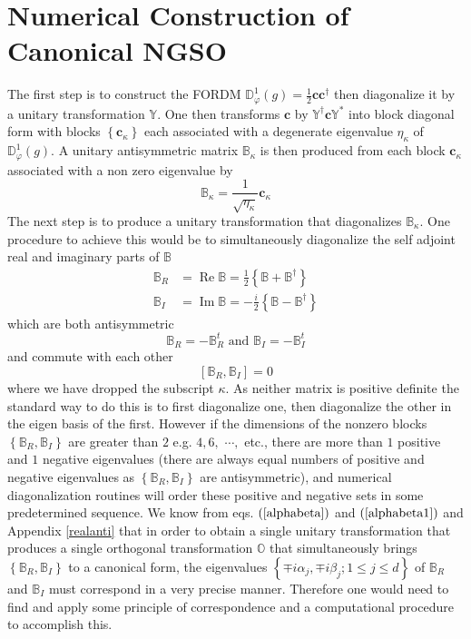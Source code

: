 \documentclass[aps,preprint]{revtex4}%
\begin{document}
\section{Numerical Construction of Canonical NGSO\label{numerical}}

The first step is to construct the FORDM $\mathbb{D}_{\varphi}^{1}\left(
g\right)  =\frac{1}{2}\mathbf{cc}^{\dagger}$ then diagonalize it by a unitary
transformation $\mathbb{Y}$. One then transforms $\mathbf{c}$ by
$\mathbb{Y}^{\dagger}\mathbf{c}\mathbb{Y}^{\ast}$ into block diagonal form
with blocks $\left\{  \mathbf{c}_{\kappa}\right\}  $ each associated with a
degenerate eigenvalue $\eta_{\kappa}$ of $\mathbb{D}_{\varphi}^{1}\left(
g\right)  .$ A unitary antisymmetric matrix $\mathbb{B}_{\kappa}$ is then
produced from each block $\mathbf{c}_{\kappa}$ associated with a non zero
eigenvalue by
\begin{equation}
\mathbb{B}_{\kappa}=\frac{1}{\sqrt{\eta_{\kappa}}}\mathbf{c}_{\kappa}%
\end{equation}
The next step is to produce a unitary transformation that diagonalizes
$\mathbb{B}_{\kappa}$. One procedure to achieve this would be to
simultaneously diagonalize the self adjoint real and imaginary parts of
$\mathbb{B}$
\begin{align}
\mathbb{B}_{R} &  =\operatorname{Re}\mathbb{B}=\frac{1}{2}\left\{
\mathbb{B+B}^{\dagger}\right\}  \nonumber\\
\mathbb{B}_{I} &  =\operatorname{Im}\mathbb{B}=-\frac{i}{2}\left\{
\mathbb{B-B}^{\dagger}\right\}
\end{align}
which are both antisymmetric
\begin{equation}
\mathbb{B}_{R}=-\mathbb{B}_{R}^{t}\text{ and }\mathbb{B}_{I}=-\mathbb{B}%
_{I}^{t}%
\end{equation}
and commute with each other
\begin{equation}
\left[  \mathbb{B}_{R},\mathbb{B}_{I}\right]  =0
\end{equation}
where we have dropped the subscript $\kappa$. As neither matrix is positive
definite the standard way to do this is to first diagonalize one, then
diagonalize the other in the eigen basis of the first. However if the
dimensions of the nonzero blocks $\left\{  \mathbb{B}_{R},\mathbb{B}%
_{I}\right\}  $ are greater than $2$ e.g. $4,6,$ $\cdots,$ etc., there are
more than $1$ positive and $1$ negative eigenvalues (there are always equal
numbers of positive and negative eigenvalues as $\left\{  \mathbb{B}%
_{R},\mathbb{B}_{I}\right\}  $ are antisymmetric), and numerical
diagonalization routines will order these positive and negative sets in some
predetermined sequence. We know from eqs. $\left(  \ref{alphabeta}\right)  $
and $\left(  \ref{alphabeta1}\right)  $ and Appendix \ref{realanti} that in
order to obtain a single unitary transformation that produces a single
orthogonal transformation $\mathbb{O}$ that simultaneously brings $\left\{
\mathbb{B}_{R},\mathbb{B}_{I}\right\}  $ to a canonical form, the eigenvalues
$\left\{  \mp i\alpha_{j},\mp i\beta_{j};1\leq j\leq d\right\}  $ of
$\mathbb{B}_{R}$ and $\mathbb{B}_{I}$ must correspond in a very precise
manner. Therefore one would need to find and apply some principle of
correspondence and a computational procedure to accomplish this.
\end{document}
